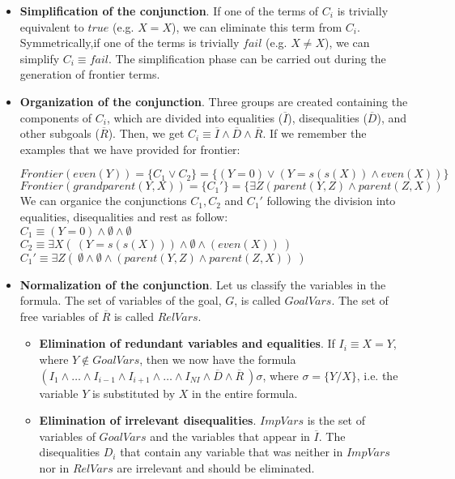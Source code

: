 \documentclass{tlp}
\begin{document}
\begin{itemize}

\item {\bf Simplification of the conjunction}. If one of the terms of
$C_i$ is trivially equivalent to $true$ (e.g. $X=X$), we can eliminate
this term from $C_i$. Symmetrically,if one of the terms is trivially
$fail$ (e.g. $X \neq X$), we can simplify $C_i \equiv fail$. The
simplification phase can be carried out during the generation of
frontier terms.

\item {\bf Organization of the conjunction}. Three groups are created
containing the components of $C_i$, which are divided into equalities
($\overline{I}$), disequalities ($\overline{D}$), and other subgoals
($\overline{R}$).  Then, we get $C_i \equiv \overline{I} \wedge
\overline{D} \wedge \overline{R}$. If we remember the examples that we have
provided for frontier:

$Frontier(even(Y)) = \{ C_1  \vee  C_2 \} = \{ ( Y=0 ) \vee ( Y=s(s(X)) \wedge
even(X) ) \}$ \\
$Frontier(grandparent(Y,X)) = \{ C_1'\} =   \{ \exists Z (parent(Y,Z) \wedge
parent(Z,X) )$ \\

We can organice the conjunctions $C_1, C_2$ and $C_1'$ following the division
into equalities, disequalities and rest as follow:\\
$C_1 \equiv ( Y=0 )  \wedge  \emptyset \wedge \emptyset$ \\
$C_2 \equiv  \exists X (~( Y=s(s(X)) ) \wedge \emptyset \wedge ( even(X) )~ )$ \\
$C_1' \equiv \exists Z (~ \emptyset \wedge \emptyset \wedge ( parent(Y,Z) \wedge
parent(Z,X)  ) ~)$ \\
  
\item {\bf Normalization of the conjunction}. Let us classify the
variables in the formula. The set of variables of the
goal, $G$, is called $GoalVars$. The set of free variables of $\overline{R}$
is called $RelVars$.

    \begin{itemize}


       \item {\bf Elimination of redundant variables and
       equalities}. If $I_i \equiv X = Y$, where $Y \not\in GoalVars$,
       then we now have the formula $ ( I_1 \wedge \ldots \wedge
       I_{i-1} \wedge I_{i+1} \wedge \ldots \wedge I_{NI} \wedge
       \overline{D} \wedge \overline{R}~) \sigma $, where $ \sigma = \{
       Y / X \}$, i.e. the variable $Y$ is substituted by $X$ in the
       entire formula. 
       \item {\bf Elimination of irrelevant disequalities}. $ImpVars$
       is the set of variables of $GoalVars$ and the variables that
       appear in $\overline{I}$. The disequalities $D_i$ that contain
       any variable that was neither in $ImpVars$ nor in $RelVars$ are
       irrelevant and should be eliminated.

    \end{itemize}

 \end{itemize}
\end{document}
